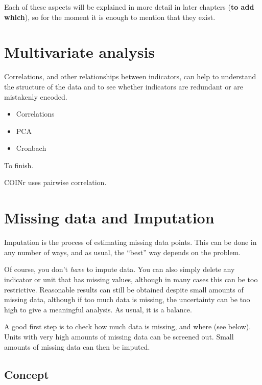 \documentclass[
]{book}
\providecommand{\tightlist}{%
  \setlength{\itemsep}{0pt}\setlength{\parskip}{0pt}}
\begin{document}
Each of these aspects will be explained in more detail in later chapters (\textbf{to add which}), so for the moment it is enough to mention that they exist.

\hypertarget{multivariate-analysis}{%
\chapter{Multivariate analysis}\label{multivariate-analysis}}

Correlations, and other relationships between indicators, can help to understand the structure of the data and to see whether indicators are redundant or are mistakenly encoded.

\begin{itemize}
\tightlist
\item
  Correlations
\item
  PCA
\item
  Cronbach
\end{itemize}

To finish.

COINr uses pairwise correlation.

\hypertarget{missing-data-and-imputation}{%
\chapter{Missing data and Imputation}\label{missing-data-and-imputation}}

Imputation is the process of estimating missing data points. This can be done in any number of ways, and as usual, the ``best'' way depends on the problem.

Of course, you don't \emph{have} to impute data. You can also simply delete any indicator or unit that has missing values, although in many cases this can be too restrictive. Reasonable results can still be obtained despite small amounts of missing data, although if too much data is missing, the uncertainty can be too high to give a meaningful analysis. As usual, it is a balance.

A good first step is to check how much data is missing, and where (see below). Units with very high amounts of missing data can be screened out. Small amounts of missing data can then be imputed.

\hypertarget{concept}{%
\section{Concept}\label{concept}}
\end{document}
